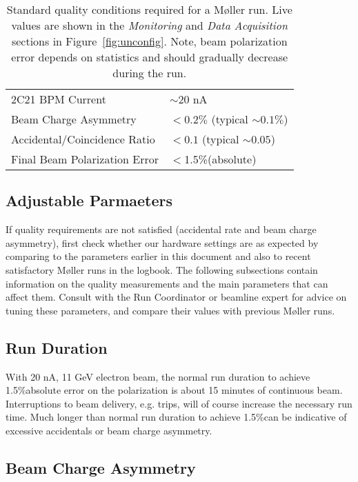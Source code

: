 \documentclass[amsmath,amssymb,notitlepage,12pt]{revtex4}
\newcommand{\ibeam}{20 nA\ }
\newcommand{\easy}{1.5\%}
\begin{document}
\begin{table}[htbp]\centering
    \begin{tabular}{ll}\toprule[1.5pt]
        2C21 BPM Current & $\sim$\ibeam\\
        Beam Charge Asymmetry & $<0.2\%$ (typical $\sim 0.1\%$)\\
        Accidental/Coincidence Ratio & $<0.1$ (typical $\sim 0.05$)\\
        Final Beam Polarization Error & $<$\easy (absolute)\\
        \bottomrule[1.5pt]
    \end{tabular}
    \caption{Standard quality conditions required for a M{\o}ller run.  Live values are shown in the {\em Monitoring} and {\em Data Acquisition} sections in Figure~\ref{fig:unconfig}.  Note, beam polarization error depends on statistics and should gradually decrease during the run.\label{tab:reqs}}
\end{table}

\subsection{Adjustable Parmaeters}\label{sec:knobs}

If quality requirements are not satisfied (accidental rate and beam charge asymmetry), first check whether our hardware settings are as expected by comparing to the parameters earlier in this document and also to recent satisfactory M{\o}ller runs in the logbook.  The following subsections contain information on the quality measurements and the main parameters that can affect them.  Consult with the Run Coordinator or beamline expert for advice on tuning these parameters, and compare their values with previous M{\o}ller runs.

\subsection{Run Duration}

With 20 nA, 11 GeV electron beam, the normal run duration to achieve \easy absolute error on the polarization is about 15 minutes of continuous beam.  Interruptions to beam delivery, e.g. trips, will of course increase the necessary run time.  Much longer than normal run duration to achieve \easy can be indicative of excessive accidentals or beam charge asymmetry.

\subsection{Beam Charge Asymmetry}
\end{document}
